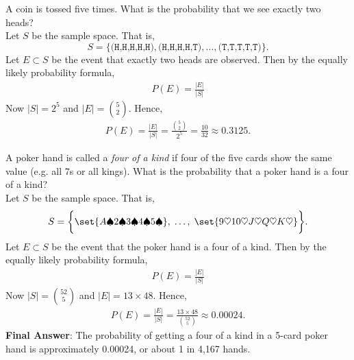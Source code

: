 \documentclass[10pt]{beamer}
\begin{document}
\begin{frame}
\begin{mybluebox}[title=\text{Example: Coin tossing}]
A coin is tossed five times.  What is the probability that we see exactly two heads?  \\

%
Let $S$ be the sample space.  That is,
 \[ S=\bigg\{\texttt{(H,H,H,H,H)}, \texttt{(H,H,H,H,T)}, \hdots, \texttt{(T,T,T,T,T)} \bigg\}. \]
Let $E \subset S$ be the event that exactly two heads are observed.
%
Then by the equally likely probability formula,
\begin{align*}
P(E) = 	\frac{|E|}{|S|}
\end{align*}
%
Now $|S|=2^{5}$ and $|E|=\binom{5}{2}$.
Hence,
%
\begin{align*}
P(E) = 	\frac{|E|}{|S|} = \frac{\binom{5}{2}}{2^{5}} = \frac{10}{32} \approx 0.3125.
\end{align*}
\end{mybluebox}

\end{frame}

\begin{frame}
\small 
\begin{mybluebox}[title=\text{Example: Four of a kind}]
A poker hand is called a \textit{four of a kind} if four of the five cards show the same value (e.g. all 7s or all kings).  What is the probability that a poker hand is a four of a kind?  \\

%
Let $S$ be the sample space.  That is,
\[S=\bigg\{ \set{A\spadesuit 2 \spadesuit 3 \spadesuit 4 \spadesuit 5 \spadesuit}, \;   \hdots, \; \set{9 \heartsuit 10 \heartsuit J \heartsuit Q \heartsuit K \heartsuit} \bigg\}. \]
Let $E \subset S$ be the event that the poker hand is a four of a kind.
%
Then by the equally likely probability formula,
\begin{align*}
P(E) = 	\frac{|E|}{|S|}
\end{align*}
%
Now $|S|=\binom{52}{5}$ and $|E|=13 \times 48$.
Hence,
%
\begin{align*}
P(E) = 	\frac{|E|}{|S|} = \frac{13 \times 48}{\binom{52}{5}} \approx 0.00024.
\end{align*}
\vfill
\textbf{Final Answer}: The probability of getting a four of a kind in a 5-card poker hand is approximately 0.00024, or about 1 in 4,167 hands.
\end{mybluebox}

\end{frame}
\end{document}

